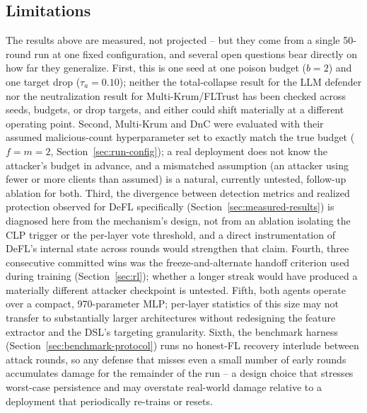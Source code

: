 \documentclass[conference]{IEEEtran}
\begin{document}
\subsection{Limitations}
\label{sec:limitations}
The results above are measured, not projected -- but they come from a single 50-round run at one fixed configuration, and several open questions bear directly on how far they generalize. First, this is one seed at one poison budget ($b=2$) and one target drop ($\tau_a=0.10$); neither the total-collapse result for the LLM defender nor the neutralization result for Multi-Krum/FLTrust has been checked across seeds, budgets, or drop targets, and either could shift materially at a different operating point. Second, Multi-Krum and DnC were evaluated with their assumed malicious-count hyperparameter set to exactly match the true budget ($f=m=2$, Section~\ref{sec:run-config}); a real deployment does not know the attacker's budget in advance, and a mismatched assumption (an attacker using fewer or more clients than assumed) is a natural, currently untested, follow-up ablation for both. Third, the divergence between detection metrics and realized protection observed for DeFL specifically (Section~\ref{sec:measured-results}) is diagnosed here from the mechanism's design, not from an ablation isolating the CLP trigger or the per-layer vote threshold, and a direct instrumentation of DeFL's internal state across rounds would strengthen that claim. Fourth, three consecutive committed wins was the freeze-and-alternate handoff criterion used during training (Section~\ref{sec:rl}); whether a longer streak would have produced a materially different attacker checkpoint is untested. Fifth, both agents operate over a compact, 970-parameter MLP; per-layer statistics of this size may not transfer to substantially larger architectures without redesigning the feature extractor and the DSL's targeting granularity. Sixth, the benchmark harness (Section~\ref{sec:benchmark-protocol}) runs no honest-FL recovery interlude between attack rounds, so any defense that misses even a small number of early rounds accumulates damage for the remainder of the run -- a design choice that stresses worst-case persistence and may overstate real-world damage relative to a deployment that periodically re-trains or resets.
\end{document}
